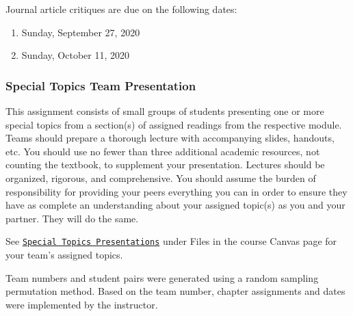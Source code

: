 \documentclass[
]{article}
\providecommand{\tightlist}{%
  \setlength{\itemsep}{0pt}\setlength{\parskip}{0pt}}
\begin{document}
Journal article critiques are due on the following dates:

\begin{enumerate}
\def\labelenumi{\arabic{enumi}.}
\tightlist
\item
  Sunday, September 27, 2020
\item
  Sunday, October 11, 2020
\end{enumerate}

\subsubsection{Special Topics Team Presentation}

This assignment consists of small groups of students presenting one or
more special topics from a section(s) of assigned readings from the
respective module. Teams should prepare a thorough lecture with
accompanying slides, handouts, etc. You should use no fewer than three
additional academic resources, not counting the textbook, to supplement
your presentation. Lectures should be organized, rigorous, and
comprehensive. You should assume the burden of responsibility for
providing your peers everything you can in order to ensure they have as
complete an understanding about your assigned topic(s) as you and your
partner. They will do the same.

See \texttt{\href{https://bit.ly/3hrdx08}{Special Topics Presentations}}
under Files in the course Canvas page for your team's assigned topics.

Team numbers and student pairs were generated using a random sampling
permutation method. Based on the team number, chapter assignments and
dates were implemented by the instructor.
\end{document}
